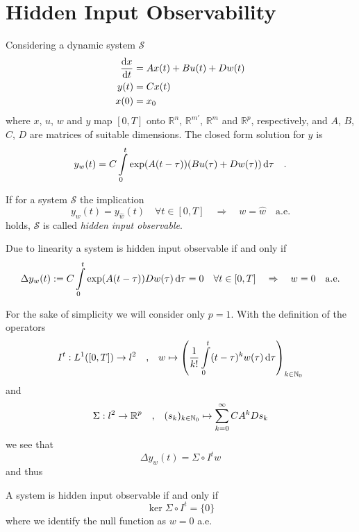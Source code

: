 \section{Hidden Input Observability}
Considering a dynamic system $\mathcal{S}$
\begin{align}
\frac{\text{d} x}{\text{d} t} &= Ax(t) + Bu(t) + Dw(t) \\
y(t) &= Cx(t) \\
x(0) &= x_0
\end{align}
where $x$, $u$, $w$ and $y$ map $[0,T]$ onto $\mathbb{R}^n$, 
$\mathbb{R}^{m'}$, $\mathbb{R}^m$ and $\mathbb{R}^p$, respectively, and 
$A$, $B$, $C$, $D$ are matrices of suitable dimensions. The 
closed form solution for $y$ is
\begin{equation}
y_w(t) = C \int\limits_0^t \exp(A(t-\tau)) (Bu(\tau) + Dw(\tau) ) \, \text{d} 
\tau \quad .
\end{equation}

\begin{definition}
If for a system $\mathcal{S}$ the implication
\begin{equation}
y_{w}(t) = y_{\hat{w}}(t) \quad \forall t\in [0,T]
\quad \Rightarrow \quad 
 w = \hat{w} \quad \text{a.e.}
\end{equation}
holds, $\mathcal{S}$ is called \textit{hidden input observable}.
\end{definition}


Due to linearity a system is hidden input observable if and only if 
\begin{equation}
\Delta y_w(t) := C\int\limits_0^t \exp(A(t-\tau))Dw(\tau)\,\text{d}\tau = 0 \quad 
\forall t\in[0,T] \quad \Rightarrow \quad 
w = 0 \quad \text{a.e.}
\end{equation}

For the sake of simplicity we will consider only $p=1$. With the 
definition of the operators
\begin{equation}
I^t:L^1([0,T]) \rightarrow l^2 \quad \text{,} \quad w \mapsto \left( 
\frac{1}{k!} \int\limits_0^t (t-\tau)^k w(\tau) \, \text{d}\tau
\right)_{k\in \mathbb{N}_0}
\end{equation}
and 
\begin{equation}
\Sigma:l^2 \rightarrow \mathbb{R}^p \quad \text{,} \quad (s_k)_{k\in\mathbb{N}_0}
\mapsto \sum\limits_{k=0}^\infty C A^k D s_k
\end{equation}
we see that 
\begin{equation}
\Delta y_w(t) = \Sigma\circ I^t w 
\end{equation}
and thus
\begin{corollary}
A system is hidden input observable if and only if 
\begin{equation}
\ker{\Sigma \circ I^t} = \{0\} \label{eq:introduction:observable}
\end{equation}
where we identify the null function as $w=0$ a.e.
\end{corollary}